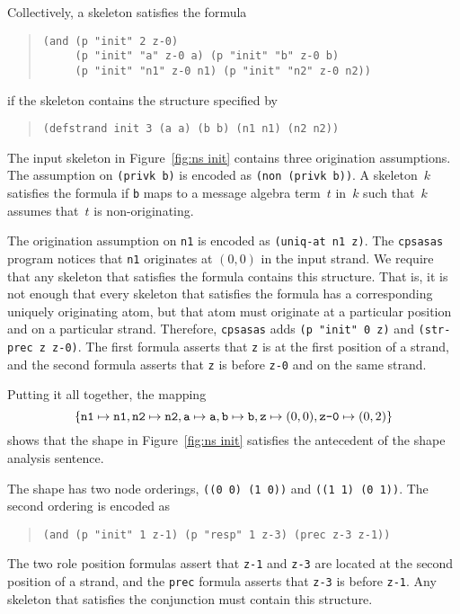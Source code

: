 \documentclass[12pt]{article}
\begin{document}
Collectively, a skeleton satisfies the formula
\begin{quote}
\begin{verbatim}
(and (p "init" 2 z-0)
     (p "init" "a" z-0 a) (p "init" "b" z-0 b)
     (p "init" "n1" z-0 n1) (p "init" "n2" z-0 n2))
\end{verbatim}
\end{quote}
if the skeleton contains the structure specified by
\begin{quote}
\begin{verbatim}
(defstrand init 3 (a a) (b b) (n1 n1) (n2 n2))
\end{verbatim}
\end{quote}

The input skeleton in Figure~\ref{fig:ns init} contains three
origination assumptions.  The assumption on \texttt{(privk b)} is
encoded as \texttt{(non (privk b))}.  A skeleton~$k$ satisfies the
formula if \texttt{b} maps to a message algebra term~$t$ in~$k$ such
that~$k$ assumes that~$t$ is non-originating.

The origination assumption on \texttt{n1} is encoded as
\texttt{(uniq-at n1 z)}.  The \texttt{cpsasas} program notices that
\texttt{n1} originates at $(0,0)$ in the input strand.  We require
that any skeleton that satisfies the formula contains this structure.
That is, it is not enough that every skeleton that satisfies the
formula has a corresponding uniquely originating atom, but that atom
must originate at a particular position and on a particular strand.
Therefore, \texttt{cpsasas} adds \texttt{(p "init" 0 z)} and
\texttt{(str-prec z z-0)}.  The first formula asserts that \texttt{z}
is at the first position of a strand, and the second formula asserts
that \texttt{z} is before \texttt{z-0} and on the same strand.

Putting it all together, the mapping
\[\{\mathtt{n1}\mapsto\mathtt{n1},
\mathtt{n2}\mapsto\mathtt{n2},
\mathtt{a}\mapsto\mathtt{a},
\mathtt{b}\mapsto\mathtt{b},
\mathtt{z}\mapsto(0,0),
\mbox{\tt z-0}\mapsto(0,2)\}\]
shows that the shape in Figure~\ref{fig:ns init} satisfies the
antecedent of the shape analysis sentence.

The shape has two node orderings, \texttt{((0 0) (1 0))} and
\texttt{((1 1) (0 1))}.  The second ordering is encoded as
\begin{quote}
\begin{verbatim}
(and (p "init" 1 z-1) (p "resp" 1 z-3) (prec z-3 z-1))
\end{verbatim}
\end{quote}
The two role position formulas assert that \texttt{z-1} and
\texttt{z-3} are located at the second position of a strand, and the
\texttt{prec} formula asserts that \texttt{z-3} is before
\texttt{z-1}.  Any skeleton that satisfies the conjunction must
contain this structure.
\end{document}
